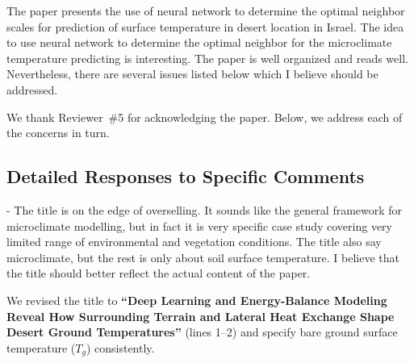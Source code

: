 \documentclass[12pt,english]{reviewresponse}
\begin{document}
\begin{generalcomment}
The paper presents the use of neural network to determine the optimal neighbor scales for prediction of surface temperature in desert location in Israel. The idea to use neural network to determine the optimal neighbor for the microclimate temperature predicting is interesting. The paper is well organized and reads well. Nevertheless, there are several issues listed below which I believe should be addressed.
\end{generalcomment}

\begin{revresponse}
We thank Reviewer~\#5 for acknowledging the paper. Below, we address each of the concerns in turn.
\end{revresponse}

\subsection*{Detailed Responses to Specific Comments}

\begin{revcomment}
- The title is on the edge of overselling. It sounds like the general framework for microclimate modelling, but in fact it is very specific case study covering very limited range of environmental and vegetation conditions. The title also say microclimate, but the rest is only about soil surface temperature. I believe that the title should better reflect the actual content of the paper.
\end{revcomment}

\begin{revresponse}
We revised the title to \textbf{``Deep Learning and Energy-Balance Modeling Reveal How Surrounding Terrain and Lateral Heat Exchange Shape Desert Ground Temperatures''} (lines 1--2) and specify bare ground surface temperature ($T_g$) consistently.
\end{revresponse}
\end{document}
